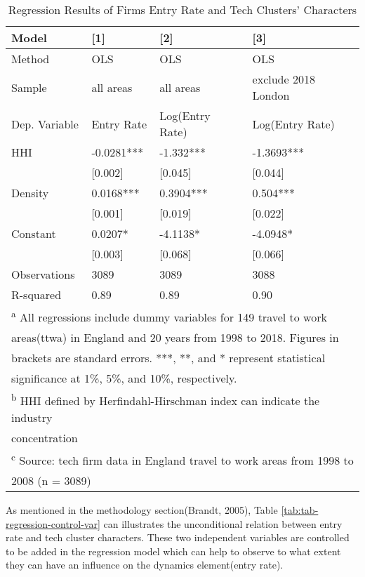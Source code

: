 \documentclass[
  12pt,
  oneside]{book}
\begin{document}
\begin{table}

\caption{\label{tab:tab-regression-entry-rate}Regression Results of Firms Entry Rate and Tech Clusters' Characters}
\centering
\begin{tabular}[t]{llll}
\toprule
\textbf{Model} & \textbf{{}[1]} & \textbf{{}[2]} & \textbf{{}[3]}\\
\midrule
Method & OLS & OLS & OLS\\
Sample & all areas & all areas & exclude 2018 London\\
Dep. Variable & Entry Rate & Log(Entry Rate) & Log(Entry Rate)\\
\midrule
HHI & -0.0281*** & -1.332*** & -1.3693***\\
 & {}[0.002] & {}[0.045] & {}[0.044]\\
\addlinespace
Density & 0.0168*** & 0.3904*** & 0.504***\\
 & {}[0.001] & {}[0.019] & {}[0.022]\\
Constant & 0.0207* & -4.1138* & -4.0948*\\
 & {}[0.003] & {}[0.068] & {}[0.066]\\
\midrule
Observations & 3089 & 3089 & 3088\\
\addlinespace
R-squared & 0.89 & 0.89 & 0.90\\
\bottomrule
\multicolumn{4}{l}{\textsuperscript{a} All regressions include dummy variables for 149 travel to work}\\
\multicolumn{4}{l}{areas(ttwa) in England and 20 years from 1998 to 2018. Figures in}\\
\multicolumn{4}{l}{brackets are standard errors. ***, **, and * represent statistical}\\
\multicolumn{4}{l}{significance at 1\%, 5\%, and 10\%, respectively.}\\
\multicolumn{4}{l}{\textsuperscript{b} HHI defined by Herfindahl-Hirschman index can indicate the industry}\\
\multicolumn{4}{l}{concentration}\\
\multicolumn{4}{l}{\textsuperscript{c} Source: tech firm data in England travel to work areas from 1998 to}\\
\multicolumn{4}{l}{2008 (n = 3089)}\\
\end{tabular}
\end{table}

As mentioned in the methodology section(Brandt, 2005), Table \ref{tab:tab-regression-control-var} can illustrates the unconditional relation between entry rate and tech cluster characters. These two independent variables are controlled to be added in the regression model which can help to observe to what extent they can have an influence on the dynamics element(entry rate).
\end{document}
